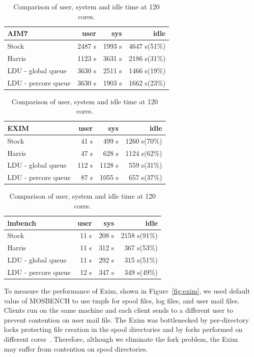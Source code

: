 \begin{table}
  \centering
  \small
  \begin{tabular}{l r r r } \toprule
    AIM7 & user & sys & idle \\
    \midrule
    Stock & 2487 s & 1993 s & 4647 s(51\%)\\ 
    Harris & 1123 s & 3631 s & 2186 s(31\%)\\
    LDU - global queue & 3630 s & 2511 s & 1466 s(19\%)\\
    LDU - percore queue & 3630 s & 1903 s & 1662 s(23\%)\\
    \bottomrule
  \end{tabular}
  \begin{tabular}{l r r r } \toprule
    EXIM & user & sys & idle \\
    \midrule
    Stock & 41 s & 499 s & 1260 s(70\%)\\ 
    Harris & 47 s & 628 s & 1124 s(62\%)\\
    LDU - global queue  & 112 s & 1128 s & 559 s(31\%)\\
    LDU - percore queue & 87 s & 1055 s & 657 s(37\%)\\
    \bottomrule
  \end{tabular}
  \begin{tabular}{l r r r } \toprule
    lmbench & user & sys & idle \\
    \midrule
    Stock & 11 s & 208 s & 2158 s(91\%)\\ 
    Harris & 11 s & 312 s & 367 s(53\%)\\
    LDU - global queue & 11 s & 292 s & 315 s(51\%)\\
    LDU - percore queue & 12 s & 347 s & 349 s(49\%)\\
    \bottomrule
  \end{tabular}

  \caption{Comparison of user, system and idle time at 120 cores.}
  \label{tab:memuse}
\end{table}


To measure the performance of Exim, shown in Figure~\ref{fig:exim}, we
used default value of MOSBENCH to use tmpfs for
spool files, log files, and user mail files.
Clients run on the same machine and each client sends to a different user to
prevent contention on user mail file.
The Exim was bottlenecked by per-directory locks protecting file creation in
the spool directories and by forks performed on different
cores~\cite{SilasBoydWickizer2010LinuxScales48}.
Therefore, although we eliminate the fork problem, the Exim may suffer from
contention on spool directories. 

